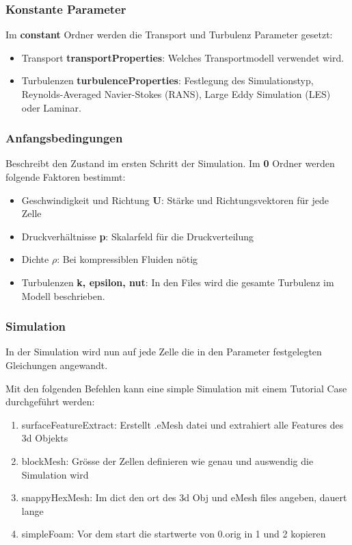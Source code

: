 \subsubsection{Konstante Parameter\label{openfoam:section:Konstante Parameter}}
Im \textbf{constant} Ordner werden die Transport und Turbulenz Parameter gesetzt:
\begin{itemize}
    \item Transport \textbf{transportProperties}: Welches Transportmodell verwendet wird.
    \item Turbulenzen \textbf{turbulenceProperties}: Festlegung des Simulationstyp, Reynolds-Averaged Navier-Stokes (RANS), Large Eddy Simulation (LES) oder Laminar.
\end{itemize}

\subsubsection{Anfangsbedingungen \label{openfoam:section:Anfangsbedingungen}}
Beschreibt den Zustand im ersten Schritt der Simulation. Im \textbf{0} Ordner werden folgende Faktoren bestimmt:
\begin{itemize}
    \item Geschwindigkeit und Richtung \textbf{U}: Stärke und Richtungsvektoren für jede Zelle
    \item Druckverhältnisse \textbf{p}: Skalarfeld für die Druckverteilung
    \item Dichte $\rho$: Bei kompressiblen Fluiden nötig %
    \item Turbulenzen \textbf{k, epsilon, nut}: In den Files wird die gesamte Turbulenz im Modell beschrieben.  
\end{itemize}

\subsubsection{Simulation\label{openfoam:section:Simulation}}
In der Simulation wird nun auf jede Zelle die in den Parameter festgelegten Gleichungen angewandt. 

Mit den folgenden Befehlen kann eine simple Simulation mit einem Tutorial Case durchgeführt werden:

\begin{enumerate}
    \item surfaceFeatureExtract: Erstellt .eMesh datei und extrahiert alle Features des 3d Objekts
    \item blockMesh: Grösse der Zellen definieren wie genau und auswendig die Simulation wird
    \item snappyHexMesh: Im dict den ort des 3d Obj und eMesh files angeben, dauert lange
    \item simpleFoam: Vor dem start die startwerte von 0.orig in 1 und 2 kopieren
\end{enumerate}


